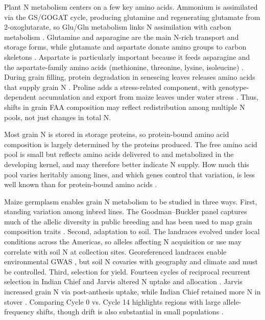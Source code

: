 \documentclass[namedate,unnumsec,webpdf,contemporary,large]{oup-authoring-template}
\begin{document}
Plant N metabolism centers on a few key amino acids. Ammonium is assimilated via the GS/GOGAT cycle, producing glutamine and regenerating glutamate from 2-oxoglutarate, so Glu/Gln metabolism links N assimilation with carbon metabolism \citep{MasclauxDaubresse2010NUE,Hodges2002TwoOxoglutarate}. Glutamine and asparagine are the main N-rich transport and storage forms, while glutamate and aspartate donate amino groups to carbon skeletons \citep{Bernard2009CytosolicGS,MasclauxDaubresse2010NUE}. Aspartate is particularly important because it feeds asparagine and the aspartate-family amino acids (methionine, threonine, lysine, isoleucine) \citep{Viola2001AspartatePathway,Wang2018AspSeeds,Han2021Aspartate}. During grain filling, protein degradation in senescing leaves releases amino acids that supply grain N \citep{Have2017NRemobilization,Liu2008ProteinDegradationNRemobilization}. Proline adds a stress-related component, with genotype-dependent accumulation and export from maize leaves under water stress \citep{Carceller1999ProlineRemobilization}. Thus, shifts in grain FAA composition may reflect redistribution among multiple N pools, not just changes in total N.

Most grain N is stored in storage proteins, so protein-bound amino acid composition is largely determined by the proteins produced. The free amino acid pool is small but reflects amino acids delivered to and metabolized in the developing kernel, and may therefore better indicate N supply. How much this pool varies heritably among lines, and which genes control that variation, is less well known than for protein-bound amino acids \citep{Shrestha2022}.

Maize germplasm enables grain N metabolism to be studied in three ways. First, standing variation among inbred lines. The Goodman--Buckler panel captures much of the allelic diversity in public breeding and has been used to map grain composition traits \citep{FlintGarcia2005Goodman,Shrestha2022}. Second, adaptation to soil. The landraces evolved under local conditions across the Americas, so alleles affecting N acquisition or use may correlate with soil N at collection sites. Georeferenced landraces enable environmental GWAS \citep{RomeroNavarro2017Landraces}, but soil N covaries with geography and climate and must be controlled. Third, selection for yield. Fourteen cycles of reciprocal recurrent selection in Indian Chief and Jarvis altered N uptake and allocation \citep{Comstock1949RRS,MollStuber1971}. Jarvis increased grain N via post-anthesis uptake, while Indian Chief retained more N in stover \citep{Moll1994}. Comparing Cycle 0 vs. Cycle 14 highlights regions with large allele-frequency shifts, though drift is also substantial in small populations \citep{Gerke2015DriftRRS}.
\end{document}
